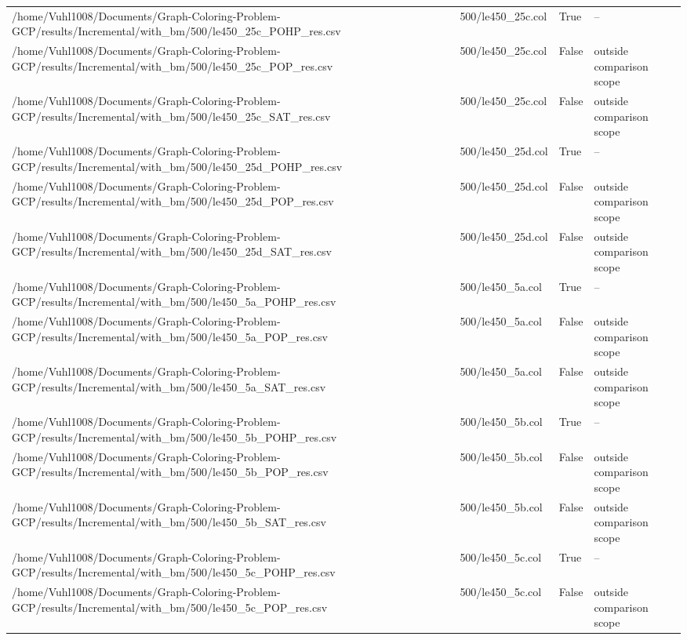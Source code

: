 \begin{table}[htbp]
\begin{tabular}{llll}
/home/Vuhl1008/Documents/Graph-Coloring-Problem-GCP/results/Incremental/with\_bm/500/le450\_25c\_POHP\_res.csv & 500/le450\_25c.col & True & -- \\
/home/Vuhl1008/Documents/Graph-Coloring-Problem-GCP/results/Incremental/with\_bm/500/le450\_25c\_POP\_res.csv & 500/le450\_25c.col & False & outside comparison scope \\
/home/Vuhl1008/Documents/Graph-Coloring-Problem-GCP/results/Incremental/with\_bm/500/le450\_25c\_SAT\_res.csv & 500/le450\_25c.col & False & outside comparison scope \\
/home/Vuhl1008/Documents/Graph-Coloring-Problem-GCP/results/Incremental/with\_bm/500/le450\_25d\_POHP\_res.csv & 500/le450\_25d.col & True & -- \\
/home/Vuhl1008/Documents/Graph-Coloring-Problem-GCP/results/Incremental/with\_bm/500/le450\_25d\_POP\_res.csv & 500/le450\_25d.col & False & outside comparison scope \\
/home/Vuhl1008/Documents/Graph-Coloring-Problem-GCP/results/Incremental/with\_bm/500/le450\_25d\_SAT\_res.csv & 500/le450\_25d.col & False & outside comparison scope \\
/home/Vuhl1008/Documents/Graph-Coloring-Problem-GCP/results/Incremental/with\_bm/500/le450\_5a\_POHP\_res.csv & 500/le450\_5a.col & True & -- \\
/home/Vuhl1008/Documents/Graph-Coloring-Problem-GCP/results/Incremental/with\_bm/500/le450\_5a\_POP\_res.csv & 500/le450\_5a.col & False & outside comparison scope \\
/home/Vuhl1008/Documents/Graph-Coloring-Problem-GCP/results/Incremental/with\_bm/500/le450\_5a\_SAT\_res.csv & 500/le450\_5a.col & False & outside comparison scope \\
/home/Vuhl1008/Documents/Graph-Coloring-Problem-GCP/results/Incremental/with\_bm/500/le450\_5b\_POHP\_res.csv & 500/le450\_5b.col & True & -- \\
/home/Vuhl1008/Documents/Graph-Coloring-Problem-GCP/results/Incremental/with\_bm/500/le450\_5b\_POP\_res.csv & 500/le450\_5b.col & False & outside comparison scope \\
/home/Vuhl1008/Documents/Graph-Coloring-Problem-GCP/results/Incremental/with\_bm/500/le450\_5b\_SAT\_res.csv & 500/le450\_5b.col & False & outside comparison scope \\
/home/Vuhl1008/Documents/Graph-Coloring-Problem-GCP/results/Incremental/with\_bm/500/le450\_5c\_POHP\_res.csv & 500/le450\_5c.col & True & -- \\
/home/Vuhl1008/Documents/Graph-Coloring-Problem-GCP/results/Incremental/with\_bm/500/le450\_5c\_POP\_res.csv & 500/le450\_5c.col & False & outside comparison scope \\

\end{tabular}
\end{table}
